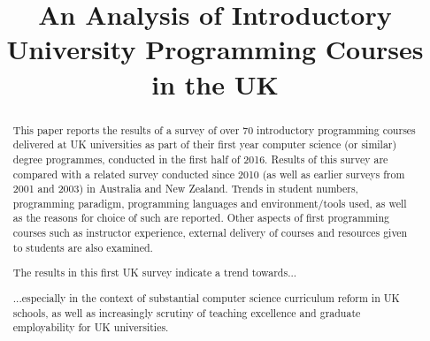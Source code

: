 \documentclass{sig-alternate}
\begin{document}
%

\title{An Analysis of Introductory University Programming Courses in the UK}
\iffalse
\numberofauthors{3}
\author{
\alignauthor
Ellen Murphy\\
\affaddr{Institute for\\Mathematical Innovation}\\
\affaddr{University of Bath}\\
\affaddr{e.murphy@bath.ac.uk}
\alignauthor
Tom Crick\\
\affaddr{Dept. of Computing}\\
\affaddr{Cardiff Metropolitan University}\\
\affaddr{tcrick@cardiffmet.ac.uk}
\alignauthor
James H. Davenport\\
\affaddr{Dept. of Computer Science}\\
\affaddr{University of Bath}\\
\affaddr{j.h.davenport@bath.ac.uk}\\
}
\fi
\maketitle

\begin{abstract}
This paper reports the results of a survey of over 70 introductory
programming courses delivered at UK universities as part of their
first year computer science (or similar) degree programmes, conducted
in the first half of 2016. Results of this survey are compared with a
related survey conducted since 2010 (as well as earlier surveys from
2001 and 2003)  in Australia and New Zealand. Trends in
student numbers, programming paradigm, programming languages and
environment/tools used, as well as the reasons for choice of such are
reported. Other aspects of first programming courses such as
instructor experience, external delivery of courses and resources
given to students are also examined.

The results in this first UK survey indicate a trend towards...

...especially in the context of substantial computer science
curriculum reform in UK schools, as well as increasingly scrutiny of
teaching excellence and graduate employability for UK universities.
\end{abstract}
\end{document}
